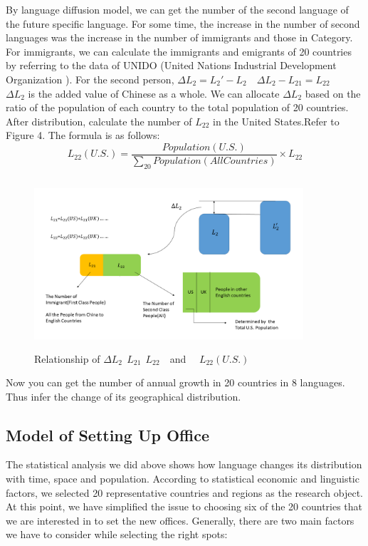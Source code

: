 \documentclass{mcmthesis}
\begin{document}
    By language diffusion model, we can get the number of the second language of the future specific language.
    For some time, the increase in the number of second languages was the increase in the number of immigrants and those in Category\uppercase\expandafter{}.
    For immigrants, we can calculate the immigrants and emigrants of 20 countries by referring to the data of UNIDO (United Nations Industrial Development Organization ).
    For the second person, $\Delta L_2=L_2'-L_2$\ \ $\Delta L_2- L_{21}= L_{22}$\\
    $\Delta L_2$ is the added value of Chinese as a whole.
    We can allocate $\Delta L_2$ based on the ratio of the population of each country to the total population of 20 countries.
    After distribution, calculate the number of $L_{22}$ in the United States.Refer to Figure 4.
    The formula is as follows:
    $$L_{22}(U.S.)=\frac{Population(U.S.)}{\sum_{20}Population(All Countries)}\times L_{22}$$
    \begin{figure}[h]
      \centering
      \includegraphics[height=6.3cm,width=10cm]{p7.png}
      \caption{Relationship of $\Delta L_2\ \ L_{21}\ \ L_{22}$\ \ and \ \ $L_{22}(U.S.)$ }
      \label{p7}
    \end{figure}

    Now you can get the number of annual growth in 20 countries in 8 languages.
    Thus infer the change of its geographical distribution.




    \subsection{Model of Setting Up Office}%

    The statistical analysis we did above shows how language changes its distribution with time, space and population.
    According to statistical economic and linguistic factors, we selected 20 representative countries and regions as the research object. At this point, we have simplified the issue to choosing six of the 20 countries that we are interested in to set the new offices.
    Generally, there are two main factors we have to consider while selecting the right spots:
\end{document}
